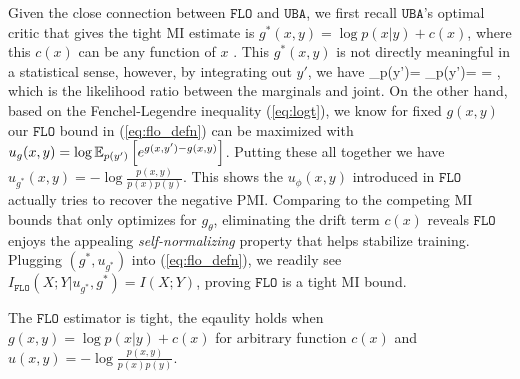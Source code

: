 \documentclass{article}
\theoremstyle{plain}
\theoremstyle{definition}
\theoremstyle{remark}
\newcommand{\UBA}{\texttt{UBA}}
\newcommand{\FLO}{\texttt{FLO}}
\newcommand{\PMI}{\text{PMI}}
\begin{document}
		Given the close connection between $\FLO$ and $\UBA$, we first recall $\UBA$'s optimal critic that gives the tight MI estimate is $g^*(x,y) = \log p(x|y) + c(x)$, where this $c(x)$ can be any function of $x$ \citep{ma2018noise}. This $g^*(x,y)$ is not directly meaningful in a statistical sense, however, by integrating out $y'$, we have
		\beq
		\EE_{p(y')}\left[e^{g^*(x,y')-g^*(x,y)}\right] = \EE_{p(y')} =  = , 
		\eeq
		which is the likelihood ratio between the marginals and joint. On the other hand, based on the Fenchel-Legendre inequality (\ref{eq:logt}), we know for fixed $g(x,y)$ our $\FLO$ bound in (\ref{eq:flo_defn}) can be maximized with $u_g(x,y) = \log \mathbb{E}_{p(y')}\left[e^{g(x,y')-g(x,y)}\right]$. Putting these all together we have $u_{g^*}(x,y) = - \log \frac{p(x,y)}{p(x)p(y)}. $
		This shows the $u_{\phi}(x,y)$ introduced in $\FLO$ actually tries to recover the negative $\PMI$. Comparing to the competing MI bounds that only optimizes for $g_{\theta}$, eliminating the drift term $c(x)$ reveals $\FLO$ enjoys the appealing {\it self-normalizing} property \citep{gutmann2010noise} that helps stabilize training. Plugging $(g^*, u_{g^*})$ into (\ref{eq:flo_defn}), we readily see $I_{\FLO}(X;Y|u_{g^*}, g^*) = I(X;Y)$, proving $\FLO$ is a tight MI bound.
		
		\begin{prop}
			\label{thm:fince}
			The $\FLO$ estimator is tight, the eqaulity holds when $g(x,y) = \log p(x|y) + c(x)$ for arbitrary function $c(x)$ and $u(x,y)=-\log \frac{p(x,y)}{p(x)p(y)}$.
		\end{prop}
		
\end{document}
